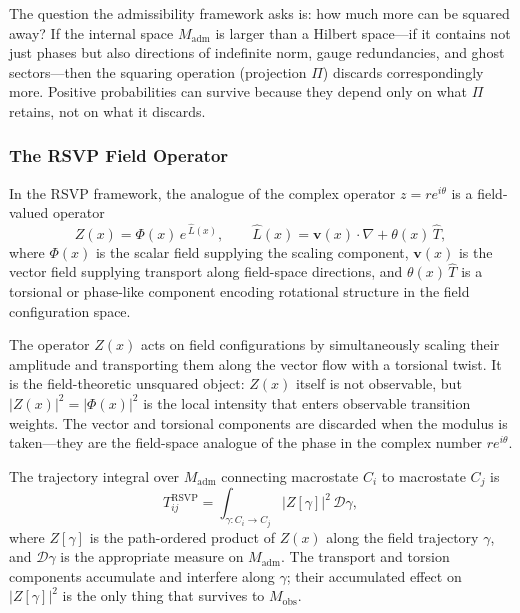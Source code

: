 \documentclass[12pt,a4paper]{article}
\theoremstyle{remark}
\begin{document}
The question the admissibility framework asks is: how much more can be
squared away? If the internal space $M_{\mathrm{adm}}$ is larger than
a Hilbert space---if it contains not just phases but also directions of
indefinite norm, gauge redundancies, and ghost sectors---then the squaring
operation (projection $\Pi$) discards correspondingly more. Positive
probabilities can survive because they depend only on what $\Pi$ retains,
not on what it discards.

\subsubsection*{The RSVP Field Operator}

In the RSVP framework, the analogue of the complex operator $z = re^{i\theta}$
is a field-valued operator
\begin{equation}
  Z(x) = \Phi(x)\,e^{\,\widehat{L}(x)},
  \qquad
  \widehat{L}(x) = \mathbf{v}(x)\cdot\nabla + \theta(x)\,\widehat{T},
\end{equation}
where $\Phi(x)$ is the scalar field supplying the scaling component,
$\mathbf{v}(x)$ is the vector field supplying transport along field-space
directions, and $\theta(x)\,\widehat{T}$ is a torsional or phase-like
component encoding rotational structure in the field configuration space.

The operator $Z(x)$ acts on field configurations by simultaneously scaling
their amplitude and transporting them along the vector flow with a torsional
twist. It is the field-theoretic unsquared object: $Z(x)$ itself is not
observable, but $|Z(x)|^2 = |\Phi(x)|^2$ is the local intensity that enters
observable transition weights. The vector and torsional components are
discarded when the modulus is taken---they are the field-space analogue of
the phase in the complex number $re^{i\theta}$.

The trajectory integral over $M_{\mathrm{adm}}$ connecting macrostate $C_i$
to macrostate $C_j$ is
\begin{equation}
  T_{ij}^{\mathrm{RSVP}}
  = \int_{\gamma : C_i \to C_j}
    \bigl|Z[\gamma]\bigr|^2\,\mathcal{D}\gamma,
\end{equation}
where $Z[\gamma]$ is the path-ordered product of $Z(x)$ along the field
trajectory $\gamma$, and $\mathcal{D}\gamma$ is the appropriate measure
on $M_{\mathrm{adm}}$. The transport and torsion components accumulate
and interfere along $\gamma$; their accumulated effect on $|Z[\gamma]|^2$
is the only thing that survives to $M_{\mathrm{obs}}$.
\end{document}
